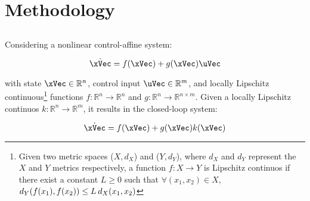 
%


\chapter{Methodology}
\label{cha:methodology}

\glsresetall %




\section{}
\label{sec:clf_cbf}

Considering a nonlinear control-affine system:

\begin{equation}
    \dot{\xVec} = f(\xVec) + g(\xVec)\uVec
    \label{eq:Nonlinear-First-Order-System} 
\end{equation}

with state \(\xVec \in \mathbb{R}^n\), control input \(\uVec \in \mathbb{R}^m\), and locally Lipschitz continuous\footnote{Given two metric spaces (\(X, d_X\)) and (\(Y, d_Y\)), where \(d_X\) and \(d_Y\)  represent the \(X\) and \(Y\) metrics respectively, a function \(f:X \to Y\) is Lipschitz continuos if there exist a constant \(L \geq 0\) such that \(\forall (x_1,x_2) \in X\), \hspace{0.4em} \(d_Y(f(x_1),f(x_2))\leq L \hspace{0.2em} d_X(x_1,x_2)\)} functions \(f: \mathbb{R}^n \to \mathbb{R}^n\) and \(g: \mathbb{R}^n \to \mathbb{R}^{n \times m}\). Given a locally Lipschitz continuos \(k: \mathbb{R}^n \to \mathbb{R}^m\), it results in the closed-loop system:

\begin{equation}
    \dot{\xVec} = f(\xVec) + g(\xVec)k(\xVec)
    \label{eq:Nonlinear-First-Order-Closed-Loop-System} 
\end{equation}

